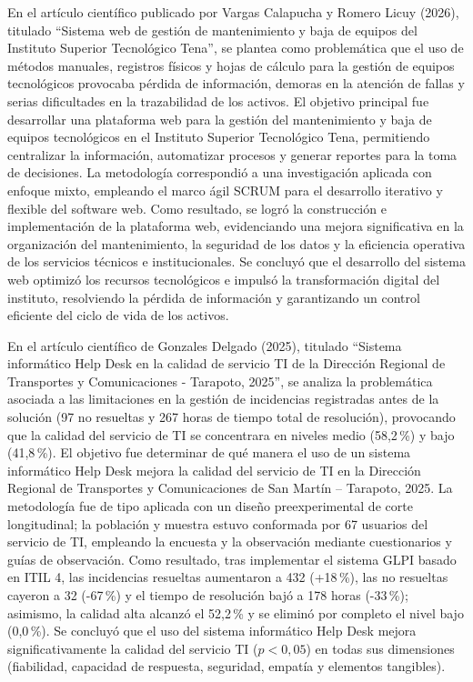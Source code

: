En el artículo científico publicado por Vargas Calapucha y Romero Licuy (2026), titulado ``Sistema web de gestión de mantenimiento y baja de equipos del Instituto Superior Tecnológico Tena'', se plantea como problemática que el uso de métodos manuales, registros físicos y hojas de cálculo para la gestión de equipos tecnológicos provocaba pérdida de información, demoras en la atención de fallas y serias dificultades en la trazabilidad de los activos. El objetivo principal fue desarrollar una plataforma web para la gestión del mantenimiento y baja de equipos tecnológicos en el Instituto Superior Tecnológico Tena, permitiendo centralizar la información, automatizar procesos y generar reportes para la toma de decisiones. La metodología correspondió a una investigación aplicada con enfoque mixto, empleando el marco ágil SCRUM para el desarrollo iterativo y flexible del software web. Como resultado, se logró la construcción e implementación de la plataforma web, evidenciando una mejora significativa en la organización del mantenimiento, la seguridad de los datos y la eficiencia operativa de los servicios técnicos e institucionales. Se concluyó que el desarrollo del sistema web optimizó los recursos tecnológicos e impulsó la transformación digital del instituto, resolviendo la pérdida de información y garantizando un control eficiente del ciclo de vida de los activos.

\vspace{0.8em}

En el artículo científico de Gonzales Delgado (2025), titulado ``Sistema informático Help Desk en la calidad de servicio TI de la Dirección Regional de Transportes y Comunicaciones - Tarapoto, 2025'', se analiza la problemática asociada a las limitaciones en la gestión de incidencias registradas antes de la solución (97 no resueltas y 267 horas de tiempo total de resolución), provocando que la calidad del servicio de TI se concentrara en niveles medio (58,2\,\%) y bajo (41,8\,\%). El objetivo fue determinar de qué manera el uso de un sistema informático Help Desk mejora la calidad del servicio de TI en la Dirección Regional de Transportes y Comunicaciones de San Martín -- Tarapoto, 2025. La metodología fue de tipo aplicada con un diseño preexperimental de corte longitudinal; la población y muestra estuvo conformada por 67 usuarios del servicio de TI, empleando la encuesta y la observación mediante cuestionarios y guías de observación. Como resultado, tras implementar el sistema GLPI basado en ITIL 4, las incidencias resueltas aumentaron a 432 (+18\,\%), las no resueltas cayeron a 32 (-67\,\%) y el tiempo de resolución bajó a 178 horas (-33\,\%); asimismo, la calidad alta alcanzó el 52,2\,\% y se eliminó por completo el nivel bajo (0,0\,\%). Se concluyó que el uso del sistema informático Help Desk mejora significativamente la calidad del servicio TI ($p < 0,05$) en todas sus dimensiones (fiabilidad, capacidad de respuesta, seguridad, empatía y elementos tangibles).

